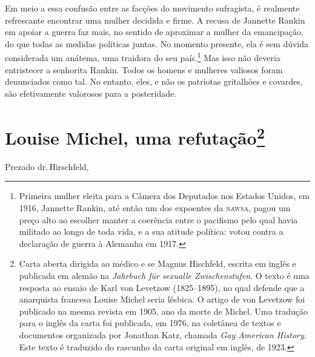 Em meio a essa confusão entre as facções do movimento sufragista, é
realmente refrescante encontrar uma mulher decidida e firme. A recusa de
Jannette Rankin em apoiar a guerra faz mais, no sentido de aproximar a
mulher da emancipação, do que todas as medidas políticas juntas. No
momento presente, ela é sem dúvida considerada um anátema, uma traidora
do seu país.\footnote{Primeira mulher eleita para a Câmera dos Deputados
  nos Estados Unidos, em 1916, Jannette Rankin, até então um dos
  expoentes da \textsc{nawsa}, pagou um preço alto ao escolher manter a coerência
  entre o pacifismo pelo qual havia militado ao longo de toda vida, e a
  sua atitude política: votou contra a declaração de guerra à Alemanha
  em 1917.} Mas isso não deveria entristecer a senhorita Rankin. Todos
os homens e mulheres valiosos foram denunciados como tal. No entanto,
eles, e não os patriotas gritalhões e covardes, são efetivamente valorosos
para a posteridade.

\chapter{Louise Michel, uma refutação\footnote{Carta aberta dirigida ao médico e
  se Magnus Hischfeld, escrita em inglês e publicada em alemão na
  \textit{Jahrbuch für sexualle Zwischenstufen}. O texto é uma resposta ao ensaio
  de Karl von Levetzow (1825--1895), no qual defende que a anarquista francesa
  Louise Michel seria lésbica. O artigo de von Levetzow foi publicado na
  mesma revista em 1905, ano da morte de Michel. Uma tradução para o
  inglês da carta foi publicada, em 1976, na coletânea de textos e
  documentos organizada por Jonathan Katz, chamada \textit{Gay American
  History}. Este texto é traduzido do rascunho da carta original em
  inglês, de 1923.}}

Prezado dr.\,Hirschfeld,

\smallskip 

